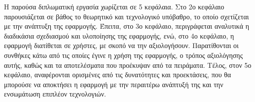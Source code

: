 Η παρούσα διπλωματική εργασία χωρίζεται σε 5 κεφάλαια. Στο 2ο κεφάλαιο παρουσιάζεται σε βάθος το θεωρητικό και τεχνολογικό υπόβαθρο, το οποίο σχετίζεται με την ανάπτυξη της εφαρμογής. Έπειτα, στο 3ο κεφάλαιο, περιγράφεται αναλυτικά η διαδικάσια σχεδιασμού και υλοποίησης της εφαρμογής, ενώ, στο 4ο κεφάλαιο, η εφαρμογή διατίθεται σε χρήστες, με σκοπό να την αξιολογήσουν. Παρατίθονται οι συνθήκες κάτω από τις οποίες έγινε η χρήση της εφαρμογής, ο τρόπος αξιολόγησης αυτής, καθώς και τα αποτελέσματα που προέκυψαν από τα πειράματα. Τέλος, στον 5ο κεφάλαιο, αναφέρονται ορισμένες από τις δυνατότητες και προεκτάσεις, που θα μπορούσε να αποκτήσει η εφαρμογή με την περαιτέρω ανάπτυξή της και την ενσωμάτωση επιπλέον τεχνολογιών.